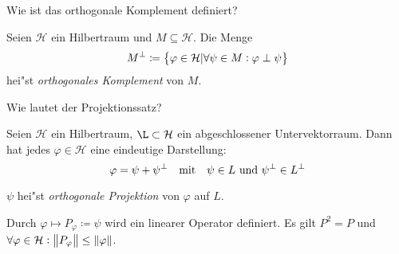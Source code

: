 \documentclass[9pt]{article}
\newcommand{\Hi}{\mathcal{H}}
\newenvironment{field}{}{\newpage}
\newif\ifnote
\newenvironment{note}{\notetrue}{\notefalse}
\newcommand{\localtag}{}
\newcommand{\globaltag}{}
\newcommand{\uuid}{}
\newcommand{\tags}[1]{
    \ifnote 
        \renewcommand{\localtag}{#1}
    \else
        \renewcommand{\globaltag}{#1}
    \fi 
    }
\newcommand{\xplain}[1]{\renewcommand{\uuid}{#1}}
\begin{document}
	\begin{note}
		\xplain{UUID}
		\tags{definition, satz, 5.2.11, 5.2.12}
			
		\begin{field}  %
			Wie ist das orthogonale Komplement definiert?
		\end{field}
		
		\begin{field}  %
			Seien $\Hi$ ein Hilbertraum und $M \subseteq \Hi$. Die Menge 
			\begin{equation*}
				M^\perp \coloneqq \qty{\varphi \in \Hi| \forall \psi \in M: \varphi \perp \psi}
			\end{equation*} 
			hei"st \textit{orthogonales Komplement} von $M$.
		\end{field}
			
		\begin{field}  %
			Wie lautet der Projektionssatz?
		\end{field}
		
		\begin{field}  %
			Seien $\Hi$ ein Hilbertraum, $\L\subset \Hi$ ein abgeschlossener Untervektorraum. Dann hat jedes $\varphi \in \Hi$ eine eindeutige Darstellung:
			\begin{equation*}
				\varphi = \psi + \psi^\perp \qq{mit} \psi \in L \text{ und } \psi^\perp \in L^\perp
			\end{equation*}
			
			$\psi$ hei"st \textit{orthogonale Projektion} von $\varphi$ auf $L$. 
			
			Durch $\varphi \mapsto P_\varphi \coloneqq \psi$ wird ein linearer Operator definiert. Es gilt $P^2=P$ und $\forall \varphi \in \Hi: \norm{P_\varphi} \leq \norm{\varphi}$.
		\end{field}
	\end{note}
\end{document}
